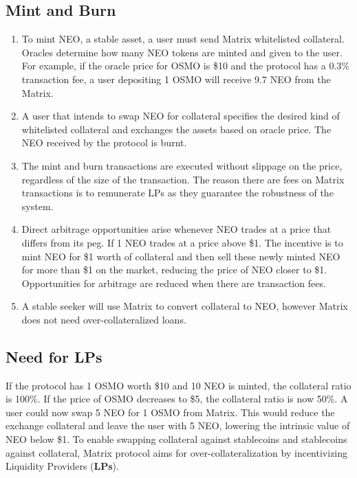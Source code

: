 \documentclass[%
 reprint,
nofootinbib,
 amsmath,amssymb,
 aps,
]{revtex4-2}
\begin{document}
\subsection{Mint and Burn}

\begin{enumerate}
\item 
  To mint NEO, a stable asset, a user must send Matrix whitelisted collateral. Oracles determine how many NEO tokens are minted and given to the user. For example, if the oracle price for OSMO is \$10 and the protocol has a 0.3\% transaction fee, a user depositing 1 OSMO will receive 9.7 NEO from the Matrix.
\item 
  A user that intends to swap NEO for collateral specifies the desired kind of whitelisted collateral and exchanges the assets based on oracle price. The NEO received by the protocol is burnt. 
\item 
  The mint and burn transactions are executed without slippage on the price, regardless of the size of the transaction. The reason there are fees on Matrix transactions is to remunerate LPs as they guarantee the robustness of the system.
\item 
  Direct arbitrage opportunities arise whenever NEO trades at a price that differs from its peg. If 1 NEO trades at a price above \$1. The incentive is to mint NEO for \$1 worth of collateral and then sell these newly minted NEO for more than \$1 on the market, reducing the price of NEO closer to \$1. Opportunities for arbitrage are reduced when there are transaction fees. 
\item 
  A stable seeker will use Matrix to convert collateral to NEO, however Matrix does not need over-collateralized loans.
\end{enumerate}

\subsection{Need for \textbf{LPs}}

  If the protocol has 1 OSMO worth \$10 and 10 NEO is minted, the collateral ratio is 100\%. If the price of OSMO decreases to \$5, the collateral ratio is now 50\%. 
  A user could now swap 5 NEO for 1 OSMO from Matrix. This would reduce the exchange collateral and leave the user with 5 NEO, lowering the intrinsic value of NEO below \$1.
  To enable swapping collateral against stablecoins and stablecoins against collateral, Matrix protocol aims for over-collateralization by incentivizing Liquidity Providers (\textbf{LPs}).
\end{document}

